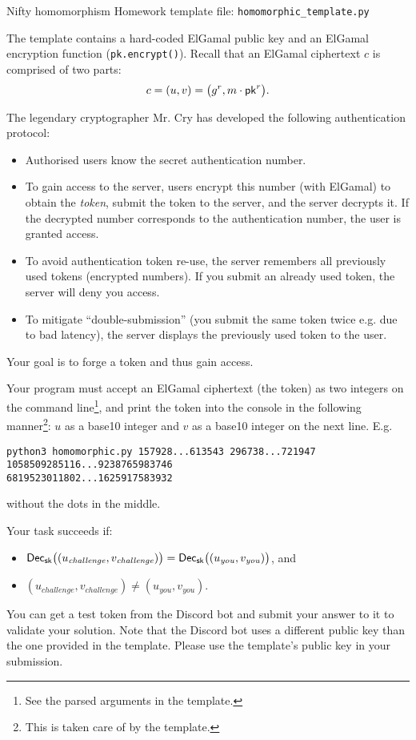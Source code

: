 \documentclass{homework}
\begin{document}
\newpage

\begin{task}{Nifty homomorphism}
  Homework template file: \texttt{homomorphic\_template.py}

  The template contains a hard-coded ElGamal public key and an ElGamal encryption function (\texttt{pk.encrypt()}).
  Recall that an ElGamal ciphertext $c$ is comprised of two parts:
  \[
    c = (u, v) = \bigl(g^r, m\cdot\mathsf{pk}^r\bigr).
  \]

  The legendary cryptographer Mr. Cry has developed the following authentication protocol:
  \begin{itemize}
    \item Authorised users know the secret authentication number.
    \item To gain access to the server, users encrypt this number (with ElGamal) to obtain the \emph{token}, submit the token to the server, and the server decrypts it.
    If the decrypted number corresponds to the authentication number, the user is granted access.
    \item To avoid authentication token re-use, the server remembers all previously used tokens (encrypted numbers).
    If you submit an already used token, the server will deny you access.
    \item To mitigate \enquote{double-submission} (you submit the same token twice e.g. due to bad latency), the server displays the previously used token to the user.
  \end{itemize}

  Your goal is to forge a token and thus gain access.

  Your program must accept an ElGamal ciphertext (the token) as two integers on the command line\footnote{See the parsed arguments in the template.}, and print the token into the console in the following manner\footnote{This is taken care of by the template.}: $u$ as a base10 integer and $v$ as a base10 integer on the next line.
  E.g.
  \begin{Verbatim}
python3 homomorphic.py 157928...613543 296738...721947
1058509285116...9238765983746
6819523011802...1625917583932
  \end{Verbatim}
  without the dots in the middle.
  
  Your task succeeds if:
  \begin{itemize}
    \item $\mathsf{Dec}_{\mathsf{sk}}\bigl((u_\mathit{challenge}, v_\mathit{challenge})\bigr) = \mathsf{Dec}_{\mathsf{sk}}\bigl((u_\mathit{you}, v_\mathit{you})\bigr)$, and
    \item $(u_\mathit{challenge}, v_\mathit{challenge}) \neq (u_\mathit{you}, v_\mathit{you})$.
  \end{itemize}

  You can get a test token from the Discord bot and submit your answer to it to validate your solution.
  Note that the Discord bot uses a different public key than the one provided in the template.
  Please use the template's public key in your submission.
\end{task}
\end{document}
